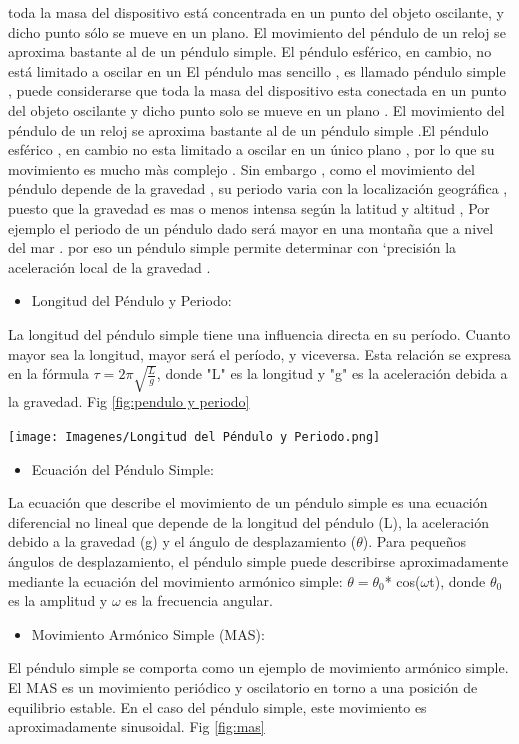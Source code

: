 \documentclass[10pt]{article}
\begin{document}
\begin{multicols}{2}
toda la masa del dispositivo está concentrada en un punto del objeto oscilante, y
dicho punto sólo se mueve en un plano. El movimiento del péndulo de un reloj se
aproxima bastante al de un péndulo simple. El péndulo esférico, en cambio, no
está limitado a oscilar en un 
El péndulo mas sencillo , es llamado péndulo simple , puede considerarse que toda la masa del dispositivo esta conectada en un punto del objeto oscilante y dicho punto solo se mueve en un plano . El movimiento del péndulo de un reloj se aproxima bastante al de un péndulo simple .El péndulo esférico , en cambio no esta limitado a oscilar en un único plano , por lo que su movimiento es mucho màs complejo . 
Sin embargo , como el movimiento del péndulo depende de la gravedad , su periodo varia con la localización geográfica , puesto que la gravedad es mas o menos intensa según la latitud y altitud , Por ejemplo el periodo de un  péndulo dado será mayor en una montaña que a nivel del mar . por eso un péndulo simple permite determinar con `precisión la aceleración local de la gravedad .
\begin{itemize}
	\item Longitud del Péndulo y Periodo:
\end{itemize}
 La longitud del péndulo simple tiene una influencia directa en su período. Cuanto mayor sea la longitud, mayor será el período, y viceversa. Esta relación se expresa en la fórmula $\tau = 2\pi \sqrt{\frac{L}{g}}$, donde "L" es la longitud y "g" es la aceleración debida a la gravedad. Fig \ref{fig:pendulo y periodo}

 \begin{center}
	\texttt{[image: Imagenes/Longitud del Péndulo y Periodo.png]}
	\label{fig:pendulo y periodo}
\end{center}
\begin{itemize}
	\item Ecuación del Péndulo Simple:
\end{itemize}
La ecuación que describe el movimiento de un péndulo simple es una ecuación diferencial no lineal que depende de la longitud del péndulo (L), la aceleración debido a la gravedad (g) y el ángulo de desplazamiento ($\theta$). Para pequeños ángulos de desplazamiento, el péndulo simple puede describirse aproximadamente mediante la ecuación del movimiento armónico simple: $\theta = \theta_{0} $* cos($\omega$t), donde $\theta_0$ es la amplitud y $\omega$ es la frecuencia angular.

\begin{itemize}
	\item Movimiento Armónico Simple (MAS): 
\end{itemize}
El péndulo simple se comporta como un ejemplo de movimiento armónico simple. El MAS es un movimiento periódico y oscilatorio en torno a una posición de equilibrio estable. En el caso del péndulo simple, este movimiento es aproximadamente sinusoidal. Fig \ref{fig:mas}


\end{multicols}
\end{document}
